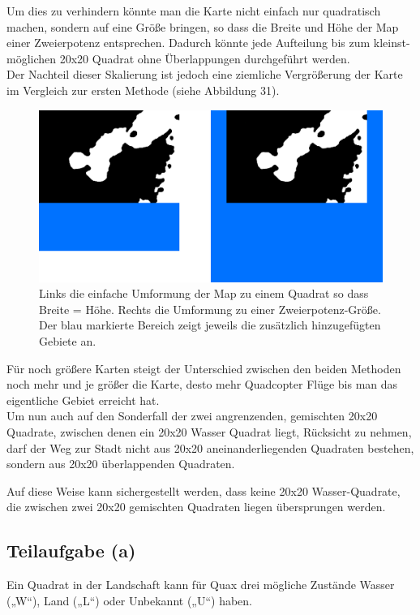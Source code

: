 \documentclass[a4paper,12pt]{article}
\begin{document}
Um dies zu verhindern könnte man die Karte nicht einfach nur quadratisch machen, sondern auf eine Größe bringen, so dass die Breite und Höhe der Map einer Zweierpotenz entsprechen. Dadurch könnte jede Aufteilung bis zum kleinst-möglichen 20x20 Quadrat ohne Überlappungen durchgeführt werden.
\\[0.4cm]
Der Nachteil dieser Skalierung ist jedoch eine ziemliche Vergrößerung der Karte im Vergleich zur ersten Methode (siehe Abbildung 31).
\begin{figure}[H]
\centering
    \includegraphics[width=.9\linewidth]{Bilder/Aufgabe3/Erweiterung_Karte.png}
    \caption{Links die einfache Umformung der Map zu einem Quadrat so dass Breite = Höhe. Rechts die Umformung zu einer Zweierpotenz-Größe. Der blau markierte Bereich zeigt jeweils die zusätzlich hinzugefügten Gebiete an.}
\end{figure}

Für noch größere Karten steigt der Unterschied zwischen den beiden Methoden noch mehr und je größer die Karte, desto mehr Quadcopter Flüge bis man das eigentliche Gebiet erreicht hat.
\\[0.4cm]
Um nun auch auf den Sonderfall der zwei angrenzenden, gemischten 20x20 Quadrate, zwischen denen ein 20x20 Wasser Quadrat liegt, Rücksicht zu nehmen, darf der Weg zur Stadt nicht aus 20x20 aneinanderliegenden Quadraten bestehen, sondern aus 20x20 überlappenden Quadraten.

Auf diese Weise kann sichergestellt werden, dass keine 20x20 Wasser-Quadrate, die zwischen zwei 20x20 gemischten Quadraten liegen übersprungen werden.

\subsection{Teilaufgabe (a)}
Ein Quadrat in der Landschaft kann für Quax drei mögliche Zustände Wasser („W“), Land („L“) oder Unbekannt („U“) haben.
\end{document}
